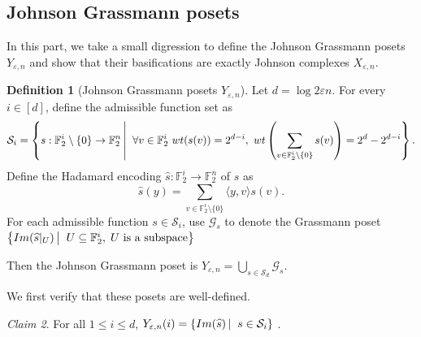 \documentclass[10pt,a4paper]{article}
\newtheorem{theorem}{Theorem}[section]
\theoremstyle{definition}
\newtheorem{definition}[theorem]{Definition}
\theoremstyle{remark}
\newtheorem{claim}[theorem]{Claim}
\newcommand{\abs}[1]{\lvert#1\rvert}
\newcommand\sett[2]{\left\{ #1 \left| \; \vphantom{#1 #2} \right. #2  \right\}}
\newcommand{\set}[1]{\{#1\}}
\newcommand{\iprod}[1]{\langle#1\rangle}
\newcommand{\F}{\mathbb{F}}
\newcommand{\Esymb}{\mathbb{E}}
\DeclareMathOperator*{\E}{\Esymb}
\newcommand{\N}{\mathbb N}
\renewcommand{\le}{\leqslant}
\renewcommand{\ge}{\geqslant}
\numberwithin{equation}{section}
\def\diml{d}
\begin{document}


\subsection{Johnson Grassmann posets}
\label{sec:JGposet}
In this part, we take a small digression to define the Johnson Grassmann posets $Y_{\varepsilon,n}$ and show that their basifications are exactly Johnson complexes $X_{\varepsilon, n}$.

\begin{definition}[Johnson Grassmann posets $Y_{\varepsilon,n}$]\label{def:Johnson-admissible-sets}
Let $\diml = \log 2\varepsilon n$. For every $i\in[\diml]$, define the admissible function set as \[\mathcal{S}_i  = \sett{s: \F_2^i\setminus \set{0} \to \F_2^n}{\forall v\in \F_2^i~ wt(s(v)) = 2^{\diml - i},~ wt\left(\sum_{v\in \F_2^i \setminus \set{0}} s(v)\right) = 2^{\diml} - 2^{\diml - i}}.\] 
Define the Hadamard encoding $\widehat{s}:\F_2^i \to \F_2^n$ of $s$ as 
\[\widehat{s}(y) = \sum_{v \in \F_2^i\setminus \set{0}} \iprod{y,v}s(v).\]
For each admissible function $s\in \mathcal{S}_i$, use $\mathcal{G}_{s}$ to denote the Grassmann poset $ \sett{Im(\widehat{s}|_U)}{U \subseteq \F_2^i, \; U \text{ is a subspace}}$

Then the Johnson Grassmann poset is $Y_{\varepsilon,n} = \bigcup_{s\in \mathcal{S}_d} \mathcal{G}_{s}$.
\end{definition}

We first verify that these posets are well-defined. 
\begin{claim} For all $1\le i\le d$,
    $Y_{\varepsilon,n}(i) = \sett{Im(\widehat{s})}{s\in  \mathcal{S}_i}$ . 
\end{claim}
 
\end{document}

